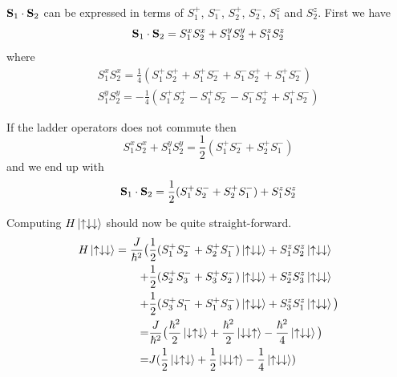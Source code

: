 \documentclass{article}
\begin{document}
$\vb{S}_1\cdot\vb{S}_2$ can be expressed in terms of $S_1^+$, $S_1^-$, $S_2^+$, $S_2^-$, $S_1^z$ and $S_2^z$. First we have
\begin{equation*}
\vb{S}_1\cdot\vb{S}_2=S_1^xS_2^x + S_1^yS_2^y + S_1^zS_2^z
\end{equation*}
where
\begin{align*}
S_1^xS_2^x= \frac{1}{4}(S_1^+S_2^+ +S_1^+S_2^- + S_1^-S_2^+ + S_1^+S_2^-)\\
S_1^yS_2^y=-\frac{1}{4}(S_1^+S_2^+ -S_1^+S_2^- - S_1^-S_2^+ + S_1^+S_2^-)
\end{align*}

If the ladder operators does not commute then
\begin{equation*}
S_1^xS_2^x + S_1^yS_2^y = \frac{1}{2}(S_1^+S_2^- + S_2^+S_1^-)
\end{equation*}
and we end up with
\begin{equation}
\vb{S}_1\cdot\vb{S}_2 = \frac{1}{2}(S_1^+S_2^- + S_2^+S_1^-) + S_1^zS_2^z
\end{equation}

Computing $H\ket{\uparrow\downarrow\downarrow}$ should now be quite straight-forward.
\begin{align*}
H\ket{\uparrow\downarrow\downarrow} = 
\frac{J}{\hbar^2} \big(&\frac{1}{2} (S_1^+S_2^- + S_2^+S_1^-)\ket{\uparrow\downarrow\downarrow} + S_1^zS_2^z\ket{\uparrow\downarrow\downarrow} \\
+&\frac{1}{2}(S_2^+S_3^- + S_3^+S_2^-)\ket{\uparrow\downarrow\downarrow} + S_2^zS_3^z\ket{\uparrow\downarrow\downarrow} \\
+&\frac{1}{2}(S_3^+S_1^- + S_1^+S_3^-)\ket{\uparrow\downarrow\downarrow} + S_3^zS_1^z\ket{\uparrow\downarrow\downarrow} \big)\\
=&\frac{J}{\hbar^2}\big(
\frac{\hbar^2}{2}\ket{\downarrow\uparrow\downarrow} + 
\frac{\hbar^2}{2}\ket{\downarrow\downarrow\uparrow} -
\frac{\hbar^2}{4}\ket{\uparrow\downarrow\downarrow} 
\big) \\
=&J(
\frac{1}{2}\ket{\downarrow\uparrow\downarrow} +
\frac{1}{2}\ket{\downarrow\downarrow\uparrow} -
\frac{1}{4}\ket{\uparrow\downarrow\downarrow})
\end{align*}
\end{document}
